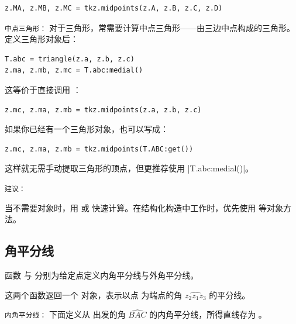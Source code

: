 \begin{mybox}
\begin{verbatim}
z.MA, z.MB, z.MC = tkz.midpoints(z.A, z.B, z.C, z.D)
\end{verbatim}
\end{mybox}

\medskip
\texttt{中点三角形：}
对于三角形，常需要计算中点三角形——由三边中点构成的三角形。定义三角形对象后：

\begin{mybox}
\begin{verbatim}
T.abc = triangle(z.a, z.b, z.c)
z.ma, z.mb, z.mc = T.abc:medial()
\end{verbatim}
\end{mybox}

这等价于直接调用 ：

\begin{mybox}
\begin{verbatim}
z.mc, z.ma, z.mb = tkz.midpoints(z.a, z.b, z.c)
\end{verbatim}
\end{mybox}

如果你已经有一个三角形对象，也可以写成：

\begin{mybox}
\begin{verbatim}
z.mc, z.ma, z.mb = tkz.midpoints(T.ABC:get())
\end{verbatim}
\end{mybox}

这样就无需手动提取三角形的顶点，但更推荐使用 |T.abc:medial()|。

\medskip
\texttt{建议：}

当不需要对象时，用  或  快速计算。在结构化构造中工作时，优先使用  等对象方法。

\subsection{角平分线}
\label{sub:bisector}

函数  与  分别为给定点定义内角平分线与外角平分线。

这两个函数返回一个  对象，表示以点  为端点的角 $\widehat{z_2 z_1 z_3}$ 的平分线。

\medskip
\texttt{内角平分线：}
 下面定义从  出发的角 $ \widehat{BAC}$ 的内角平分线，所得直线存为 。

